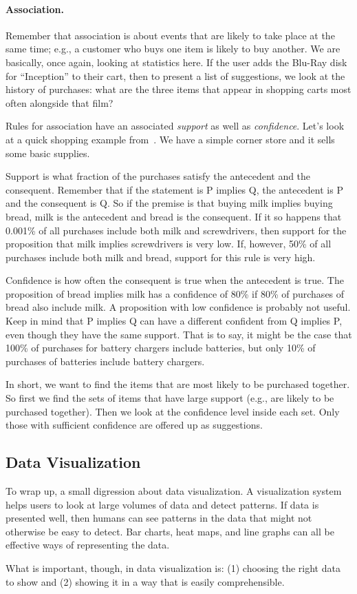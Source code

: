 \paragraph{Association.} Remember that association is about events that are likely to take place at the same time; e.g., a customer who buys one item is likely to buy another. We are basically, once again, looking at statistics here. If the user adds the Blu-Ray disk for ``Inception'' to their cart, then to present a list of suggestions, we look at the history of purchases: what are the three items that appear in shopping carts most often alongside that film?

Rules for association have an associated \textit{support} as well as \textit{confidence}. Let's look at a quick shopping example from~\cite{dsc}. We have a simple corner store and it sells some basic supplies.

Support is what fraction of the purchases satisfy the antecedent and the consequent. Remember that if the statement is P implies Q, the antecedent is P and the consequent is Q. So if the premise is that buying milk implies buying bread, milk is the antecedent and bread is the consequent. If it so happens that 0.001\% of all purchases include both milk and screwdrivers, then support for the proposition that milk implies screwdrivers is very low. If, however, 50\% of all purchases include both milk and bread, support for this rule is very high.

Confidence is how often the consequent is true when the antecedent is true. The proposition of bread implies milk has a confidence of 80\% if 80\% of purchases of bread also include milk. A proposition with low confidence is probably not useful. Keep in mind that P implies Q can have a different confident from Q implies P, even though they have the same support. That is to say, it might be the case that 100\% of purchases for battery chargers include batteries, but only 10\% of purchases of batteries include battery chargers.

In short, we want to find the items that are most likely to be purchased together. So first we find the sets of items that have large support (e.g., are likely to be purchased together). Then we look at the confidence level inside each set. Only those with sufficient confidence are offered up as suggestions. 

\subsection*{Data Visualization}

To wrap up, a small digression about data visualization. A visualization system helps users to look at large volumes of data and detect patterns. If data is presented well, then humans can see patterns in the data that might not otherwise be easy to detect. Bar charts, heat maps, and line graphs can all be effective ways of representing the data.

What is important, though, in data visualization is: (1) choosing the right data to show and (2) showing it in a way that is easily comprehensible. 





